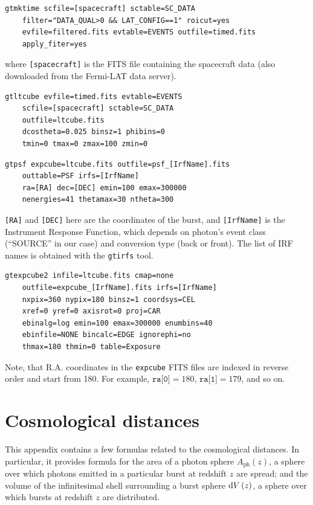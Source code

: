 \documentclass[manuscript]{aastex}
\begin{document}
\begin{lstlisting}
gtmktime scfile=[spacecraft] sctable=SC_DATA
	filter="DATA_QUAL>0 && LAT_CONFIG==1" roicut=yes
	evfile=filtered.fits evtable=EVENTS outfile=timed.fits
	apply_fiter=yes
\end{lstlisting}
where \texttt{[spacecraft]} is the FITS file containing the spacecraft data (also downloaded from the Fermi-LAT data server).

\begin{lstlisting}
gtltcube evfile=timed.fits evtable=EVENTS
	scfile=[spacecraft] sctable=SC_DATA
	outfile=ltcube.fits
	dcostheta=0.025 binsz=1 phibins=0
	tmin=0 tmax=0 zmax=100 zmin=0
\end{lstlisting}

\begin{lstlisting}
gtpsf expcube=ltcube.fits outfile=psf_[IrfName].fits
	outtable=PSF irfs=[IrfName]
	ra=[RA] dec=[DEC] emin=100 emax=300000
	nenergies=41 thetamax=30 ntheta=300
\end{lstlisting}
\texttt{[RA]} and \texttt{[DEC]} here are the coordinates of the
burst, and \texttt{[IrfName]} is the Instrument Response Function,
which depends on photon's event class (``SOURCE'' in our case) and
conversion type (back or front). The list of IRF names is obtained
with the \texttt{gtirfs} tool.

\begin{lstlisting}
gtexpcube2 infile=ltcube.fits cmap=none
	outfile=expcube_[IrfName].fits irfs=[IrfName]
	nxpix=360 nypix=180 binsz=1 coordsys=CEL
	xref=0 yref=0 axisrot=0 proj=CAR
	ebinalg=log emin=100 emax=300000 enumbins=40
	ebinfile=NONE bincalc=EDGE ignorephi=no
	thmax=180 thmin=0 table=Exposure
\end{lstlisting}
Note, that R.A. coordinates in the \texttt{expcube} FITS files are
indexed in reverse order and start from 180. For example,
$\texttt{ra[0]}=180$, $\texttt{ra[1]}=179$, and so on.

\section{Cosmological distances}
\label{sec:cosmology}
This appendix contains a few formulas related to the cosmological
distances. In particular, it provides formula for the area of a photon
sphere $A_\text{ph}\left(z\right)$, a sphere over which photons
emitted in a particular burst at redshift $z$ are spread; and the
volume of the infinitesimal shell surrounding a burst sphere $\dif
V\left(z\right)$, a sphere over which bursts at redshift $z$ are
distributed.
\end{document}
